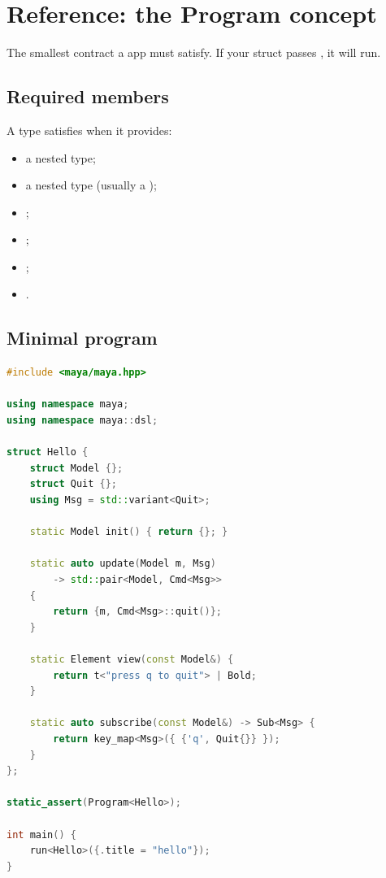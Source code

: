 \chapter{Reference: the Program concept}
\label{ch:refman-program}

\begin{aside}
The smallest contract a \maya{} app must satisfy. If your
struct passes , it will
run.
\end{aside}

\section{Required members}

A type  satisfies  when it provides:

\begin{itemize}[leftmargin=*]
  \item a nested  type;
  \item a nested  type (usually a
    );
  \item {};
  \item {};
  \item {};
  \item {}.
\end{itemize}

\section{Minimal program}

\begin{lstlisting}[language=C++]
#include <maya/maya.hpp>

using namespace maya;
using namespace maya::dsl;

struct Hello {
    struct Model {};
    struct Quit {};
    using Msg = std::variant<Quit>;

    static Model init() { return {}; }

    static auto update(Model m, Msg)
        -> std::pair<Model, Cmd<Msg>>
    {
        return {m, Cmd<Msg>::quit()};
    }

    static Element view(const Model&) {
        return t<"press q to quit"> | Bold;
    }

    static auto subscribe(const Model&) -> Sub<Msg> {
        return key_map<Msg>({ {'q', Quit{}} });
    }
};

static_assert(Program<Hello>);

int main() {
    run<Hello>({.title = "hello"});
}
\end{lstlisting}

